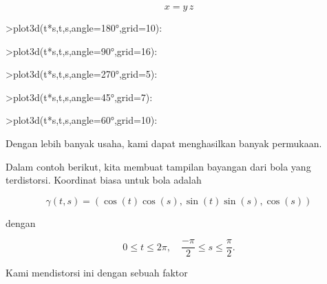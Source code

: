 \documentclass[a4paper,10pt]{article}
\begin{document}
\begin{eulernotebook}
\begin{eulercomment}
\begin{eulercomment}
\begin{eulercomment}
\end{eulercomment}
\begin{eulerformula}
\[
x = y \, z
\]
\end{eulerformula}
\begin{eulerprompt}
>plot3d(t*s,t,s,angle=180°,grid=10):
\end{eulerprompt}
\begin{eulerprompt}
>plot3d(t*s,t,s,angle=90°,grid=16):
\end{eulerprompt}
\begin{eulerprompt}
>plot3d(t*s,t,s,angle=270°,grid=5):
\end{eulerprompt}
\begin{eulerprompt}
>plot3d(t*s,t,s,angle=45°,grid=7):
\end{eulerprompt}
\begin{eulerprompt}
>plot3d(t*s,t,s,angle=60°,grid=10):
\end{eulerprompt}
\begin{eulercomment}
Dengan lebih banyak usaha, kami dapat menghasilkan banyak permukaan.

Dalam contoh berikut, kita membuat tampilan bayangan dari bola yang
terdistorsi. Koordinat biasa untuk bola adalah

\end{eulercomment}
\begin{eulerformula}
\[
\gamma(t,s) = (\cos(t)\cos(s),\sin(t)\sin(s),\cos(s))
\]
\end{eulerformula}
\begin{eulercomment}
dengan

\end{eulercomment}
\begin{eulerformula}
\[
0 \le t \le 2\pi, \quad \frac{-\pi}{2} \le s \le \frac{\pi}{2}.
\]
\end{eulerformula}
\begin{eulercomment}
Kami mendistorsi ini dengan sebuah faktor


\end{eulercomment}
\end{eulercomment}
\end{eulercomment}
\end{eulernotebook}
\end{document}
